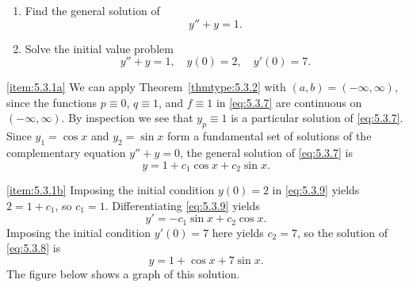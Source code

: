 \documentclass{ximera}
\begin{document}
\begin{example}\label{example:5.3.1}
\begin{enumerate}
\item \label{item:5.3.1a} %
Find the general solution of
\begin{equation} \label{eq:5.3.7}
y''+y=1.
\end{equation}
\item \label{item:5.3.1b} %
Solve the initial value problem
\begin{equation} \label{eq:5.3.8}
y''+y=1, \quad  y(0)=2,\quad y'(0)=7.
\end{equation}
\end{enumerate}
 
 
\begin{explanation} \ref{item:5.3.1a}
We can apply Theorem~\ref{thmtype:5.3.2} with $(a,b)= (-\infty,\infty)$,
since the functions $p\equiv0$, $q\equiv1$, and $f\equiv1$ in
\eqref{eq:5.3.7} are continuous on $(-\infty,\infty)$. By inspection we
see that $y_p\equiv1$ is a particular solution of \eqref{eq:5.3.7}. Since
$y_1=\cos x$ and $y_2=\sin x$ form a fundamental set of solutions of
the complementary equation $y''+y=0$, the general solution of
\eqref{eq:5.3.7} is
\begin{equation} \label{eq:5.3.9}
y=1+c_1\cos x+c_2\sin x.
\end{equation}
 
\ref{item:5.3.1b}
Imposing the initial condition $y(0)=2$ in \eqref{eq:5.3.9} yields
$2=1+c_1$, so $c_1=1$. Differentiating \eqref{eq:5.3.9} yields
$$
y'=-c_1\sin x+c_2\cos x.
$$
Imposing the initial condition $y'(0)=7$ here yields $c_2=7$,
so the solution of \eqref{eq:5.3.8} is
$$
y=1+\cos x+7\sin x.
$$
The figure below shows a graph of this solution.
 
\begin{center}
\end{center}

 
\end{explanation}
\end{example}
 
\end{document}
